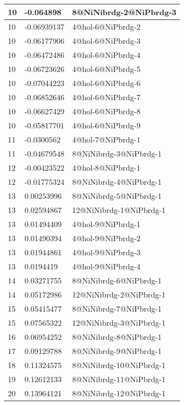 \begin{center}
\begin{longtable}{|l|l|l|}
10 & -0.064898 & 8@NiNibrdg-2@NiPbrdg-3 \\ \hline
10 & -0.06939137 & 4@hol-6@NiPbrdg-2 \\ \hline
10 & -0.06177906 & 4@hol-6@NiPbrdg-3 \\ \hline
10 & -0.06472486 & 4@hol-6@NiPbrdg-4 \\ \hline
10 & -0.06723626 & 4@hol-6@NiPbrdg-5 \\ \hline
10 & -0.07044223 & 4@hol-6@NiPbrdg-6 \\ \hline
10 & -0.06852646 & 4@hol-6@NiPbrdg-7 \\ \hline
10 & -0.06627429 & 4@hol-6@NiPbrdg-8 \\ \hline
10 & -0.05817701 & 4@hol-6@NiPbrdg-9 \\ \hline
11 & -0.0300562 & 4@hol-7@NiPbrdg-1 \\ \hline
11 & -0.04679548 & 8@NiNibrdg-3@NiPbrdg-1 \\ \hline
12 & -0.00423522 & 4@hol-8@NiPbrdg-1 \\ \hline
12 & -0.01775324 & 8@NiNibrdg-4@NiPbrdg-1 \\ \hline
13 & 0.00253996 & 8@NiNibrdg-5@NiPbrdg-1 \\ \hline
13 & 0.02594867 & 12@NiNibrdg-1@NiPbrdg-1 \\ \hline
13 & 0.01494409 & 4@hol-9@NiPbrdg-1 \\ \hline
13 & 0.01490394 & 4@hol-9@NiPbrdg-2 \\ \hline
13 & 0.01944861 & 4@hol-9@NiPbrdg-3 \\ \hline
13 & 0.0194419 & 4@hol-9@NiPbrdg-4 \\ \hline
14 & 0.03271755 & 8@NiNibrdg-6@NiPbrdg-1 \\ \hline
14 & 0.05172986 & 12@NiNibrdg-2@NiPbrdg-1 \\ \hline
15 & 0.05415477 & 8@NiNibrdg-7@NiPbrdg-1 \\ \hline
15 & 0.07565322 & 12@NiNibrdg-3@NiPbrdg-1 \\ \hline
16 & 0.06954252 & 8@NiNibrdg-8@NiPbrdg-1 \\ \hline
17 & 0.09129788 & 8@NiNibrdg-9@NiPbrdg-1 \\ \hline
18 & 0.11324575 & 8@NiNibrdg-10@NiPbrdg-1 \\ \hline
19 & 0.12612133 & 8@NiNibrdg-11@NiPbrdg-1 \\ \hline
20 & 0.13964121 & 8@NiNibrdg-12@NiPbrdg-1 \\ \hline

\end{longtable}
\end{center}
